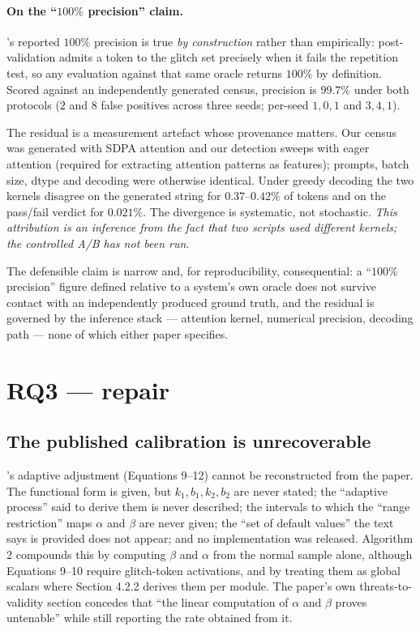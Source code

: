 \paragraph{On the ``$100\%$ precision'' claim.} \gp{}'s reported $100\%$ precision
is true \emph{by construction} rather than empirically: post-validation admits a
token to the glitch set precisely when it fails the repetition test, so any
evaluation against that same oracle returns $100\%$ by definition. Scored against
an independently generated census, precision is $99.7\%$ under both protocols
($2$ and $8$ false positives across three seeds; per-seed $1,0,1$ and $3,4,1$).

The residual is a measurement artefact whose provenance matters. Our census was
generated with SDPA attention and our detection sweeps with eager attention
(required for extracting attention patterns as features); prompts, batch size,
dtype and decoding were otherwise identical. Under greedy decoding the two
kernels disagree on the generated string for $0.37$--$0.42\%$ of tokens and on
the pass/fail verdict for $0.021\%$. The divergence is systematic, not
stochastic. \emph{This attribution is an inference from the fact that two scripts
used different kernels; the controlled A/B has not been run.}

The defensible claim is narrow and, for reproducibility, consequential: a
``$100\%$ precision'' figure defined relative to a system's own oracle does not
survive contact with an independently produced ground truth, and the residual is
governed by the inference stack --- attention kernel, numerical precision,
decoding path --- none of which either paper specifies.

\section{RQ3 --- \gp{} repair}
\label{sec:rq3}

\subsection{The published calibration is unrecoverable}

\gp{}'s adaptive adjustment (Equations 9--12) cannot be reconstructed from the
paper. The functional form is given, but $k_1, b_1, k_2, b_2$ are never stated;
the ``adaptive process'' said to derive them is never described; the intervals to
which the ``range restriction'' maps $\alpha$ and $\beta$ are never given; the
``set of default values'' the text says is provided does not appear; and no
implementation was released. Algorithm 2 compounds this by computing $\beta$ and
$\alpha$ from the normal sample alone, although Equations 9--10 require
glitch-token activations, and by treating them as global scalars where
Section 4.2.2 derives them per module. The paper's own threats-to-validity
section concedes that ``the linear computation of $\alpha$ and $\beta$ proves
untenable'' while still reporting the rate obtained from it.

